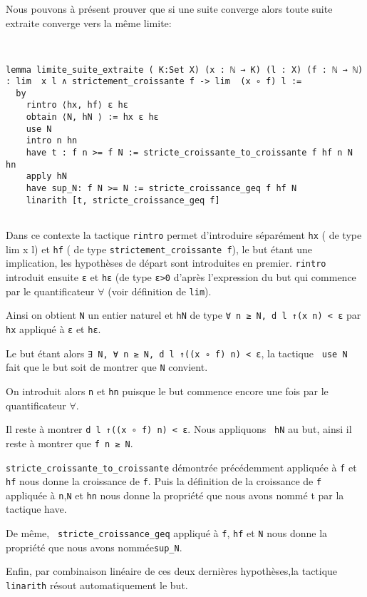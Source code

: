 \documentclass[a4paper, 12pt]{article}
\newcommand{\lean}[1]{\texttt{#1}}
\begin{document}
Nous pouvons à présent prouver que si une suite converge alors toute suite extraite converge vers la même limite:    

\begin{verbatim}    
    

lemma limite_suite_extraite ( K:Set X) (x : ℕ → K) (l : X) (f : ℕ → ℕ) : lim  x l ∧ strictement_croissante f -> lim  (x ∘ f) l :=
  by
    rintro ⟨hx, hf⟩ ε hε
    obtain ⟨N, hN ⟩ := hx ε hε
    use N
    intro n hn
    have t : f n >= f N := stricte_croissante_to_croissante f hf n N hn
    apply hN
    have sup_N: f N >= N := stricte_croissance_geq f hf N
    linarith [t, stricte_croissance_geq f]
    
\end{verbatim}

Dans ce contexte la tactique \lean{rintro} permet d'introduire séparément \lean{hx} ( de type lim x l) et \lean{hf} ( de type \lean{strictement_croissante f}), le but étant une implication, les hypothèses de départ sont introduites en premier. \lean{rintro} introduit ensuite \lean{ε} et \lean{hε} (de type \lean{ε>0} d'après l'expression du but qui commence par le quantificateur $\forall$ (voir définition de \lean{lim}).

Ainsi on obtient \lean{N} un entier naturel et \lean{hN} de type \lean{∀ n ≥ N, d l ↑(x n) < ε} par \lean{hx} appliqué à \lean{ε} et \lean{hε}.

Le but étant alors \lean{∃ N, ∀ n ≥ N, d l ↑((x ∘ f) n) < ε}, la tactique \lean{ use N} fait que le but soit de montrer que \lean{N} convient. 

On introduit alors \lean{n} et \lean{hn} puisque le but commence encore une fois par le quantificateur $\forall$. 

Il reste à montrer \lean{d l ↑((x ∘ f) n) < ε}. Nous appliquons \lean{ hN} au but, ainsi il reste à montrer que \lean{f n ≥ N}. 

\lean{stricte_croissante_to_croissante} démontrée précédemment appliquée à \lean{f} et \lean{hf} nous donne la croissance de \lean{f}. Puis la définition de la croissance de \lean{f} appliquée à \lean{n},\lean{N} et \lean{hn} nous donne la propriété que nous avons nommé t par la tactique have.

De même, \lean{ stricte_croissance_geq} appliqué à \lean{f}, \lean{hf} et \lean{N} nous donne la propriété que nous avons nommée\lean{sup_N}.

Enfin, par combinaison linéaire de ces deux dernières hypothèses,la tactique \lean{linarith} résout automatiquement le but.
\end{document}
